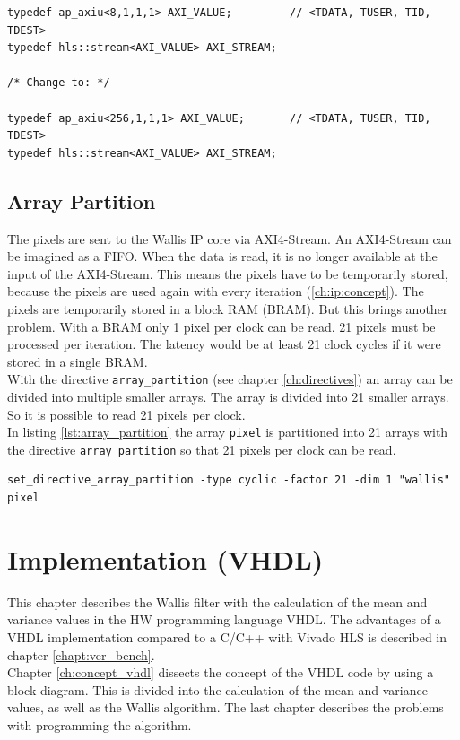 \begin{minipage}{\textwidth}
\begin{lstlisting}[style=CStyle, caption=Calculation of the division for the Wallis filter, label=lst:ip:axistream]
typedef ap_axiu<8,1,1,1> AXI_VALUE;			// <TDATA, TUSER, TID, TDEST>
typedef hls::stream<AXI_VALUE> AXI_STREAM;

/* Change to: */

typedef ap_axiu<256,1,1,1> AXI_VALUE;		// <TDATA, TUSER, TID, TDEST>
typedef hls::stream<AXI_VALUE> AXI_STREAM;
\end{lstlisting}
\end{minipage}

\subsection{Array Partition}
The pixels are sent to the Wallis IP core via AXI4-Stream. An AXI4-Stream can be imagined as a FIFO. When the data is read, it is no longer available at the input of the AXI4-Stream. This means the pixels have to be temporarily stored, because the pixels are used again with every iteration (\ref{ch:ip:concept}).
The pixels are temporarily stored in a block RAM (BRAM). But this brings another
problem. With a BRAM only 1 pixel per clock can be read. 21 pixels must be
processed per iteration. The latency would be at least 21 clock cycles if it
were stored in a single BRAM. \\
With the directive \texttt{array\_partition} (see chapter \ref{ch:directives})
an array can be divided into multiple smaller arrays. The array is divided into 21 smaller arrays. So it is possible to read 21 pixels per clock. \\
In listing \ref{lst:array_partition} the array \texttt{pixel} is partitioned into 21 arrays with the directive \texttt{array\_partition} so that 21 pixels per clock can be read. 

\begin{minipage}{\textwidth}
\begin{lstlisting}[style=TextStyle, caption=Set directive array\_partition, label=lst:array_partition]
set_directive_array_partition -type cyclic -factor 21 -dim 1 "wallis" pixel
\end{lstlisting}
\end{minipage}



\section{Implementation (VHDL)} \label{ch:ip:imp_vhdl}
This chapter describes the Wallis filter with the calculation of the mean and
variance values in the HW programming language VHDL. 
The advantages of a VHDL implementation compared to a C/C++ with Vivado HLS is
described in chapter \ref{chapt:ver_bench}. \\
Chapter \ref{ch:concept_vhdl} dissects the concept of the VHDL code by using a
block diagram. This is divided into the calculation of the mean and variance
values, as well as the Wallis algorithm. The last chapter describes the
problems with programming the algorithm.

